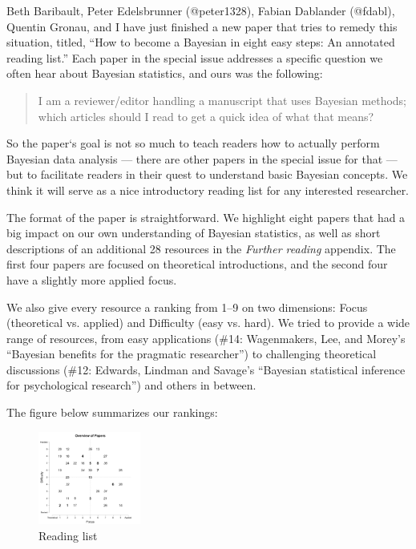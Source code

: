 {Beth Baribault, Peter Edelsbrunner (@peter1328), Fabian Dablander (@fdabl), Quentin Gronau, and I have just finished a new paper \cite{etz2018a} that tries to remedy this situation, titled, ``How to become a Bayesian in eight easy steps: An annotated reading list.'' 
 Each paper in the special issue addresses a specific question we often hear about Bayesian statistics, and ours was the following:

\begin{quote}
    I am a reviewer/editor handling a manuscript that uses Bayesian methods; which articles should I read to get a quick idea of what that means?
\end{quote}

So the paper‘s goal is not so much to teach readers how to actually perform Bayesian data analysis — there are other papers in the special issue for that — but to facilitate readers in their quest to understand basic Bayesian concepts. We think it will serve as a nice introductory reading list for any interested researcher.

The format of the paper is straightforward. We highlight eight papers that had a big impact on our own understanding of Bayesian statistics, as well as short descriptions of an additional 28 resources in the \textit{Further reading} appendix. The first four papers are focused on theoretical introductions, and the second four have a slightly more applied focus.

We also give every resource a ranking from 1–9 on two dimensions: Focus (theoretical vs. applied) and Difficulty (easy vs. hard). We tried to provide a wide range of resources, from easy applications (\#14: Wagenmakers, Lee, and Morey's ``Bayesian benefits for the pragmatic researcher'') to challenging theoretical discussions (\#12: Edwards, Lindman and Savage's ``Bayesian statistical inference for psychological research'') and others in between.

The figure below  summarizes our rankings:

\begin{figure}[h]
\centering
\includegraphics[width=0.3\textwidth]{pic/p05c03-snip23.png}
\caption{Reading list}
\label{fig:p05c03-snip23}
\end{figure}


}
